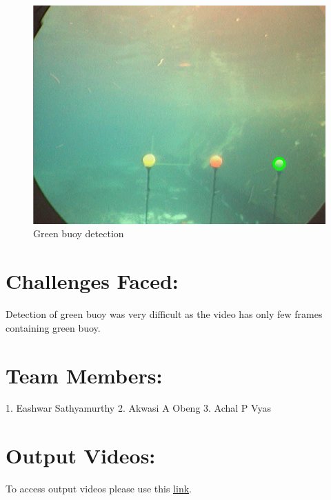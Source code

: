 \documentclass[12pt]{article}
\begin{document}
\newpage
\begin{figure}[h]
    \centering
    \includegraphics[width=16cm]{greenbuoydetection}
    \caption{Green buoy detection}
    \label{fig:Green buoy detection}
\end{figure}

\section{Challenges Faced:}
Detection of green buoy was very difficult as the video has only few frames containing green buoy.
\section{Team Members:}
1. Eashwar Sathyamurthy
2. Akwasi A Obeng
3. Achal P Vyas
\section{Output Videos:}
To access output videos please use this \href{https://drive.google.com/drive/folders/1u-9GdSQYNw-M6Cw1d2jZkYR8QPCDGkzQ?usp=sharing}{\underline{link}}.
\end{document}
